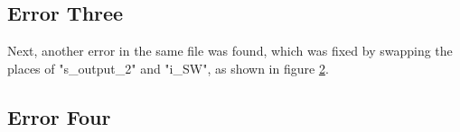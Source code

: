 \documentclass[a4paper, 12pt]{article}
\begin{document}
\begin{figure}
	\centering
	\hfill
	\caption{}
	\label{fig:err2}
\end{figure}

\subsection{Error Three}

Next, another error in the same file was found, which was fixed by swapping the places of "s\_output\_2" and "i\_SW", as shown in figure \ref{fig:err3}.

\begin{figure}
	\centering
	\hfill
	\caption{}
	\label{fig:err3}
\end{figure}

\subsection{Error Four}

\begin{figure}
\vspace{-2cm}
	\centering
	\\
	\caption{}
	\label{fig:err4}
\end{figure}
\end{document}
